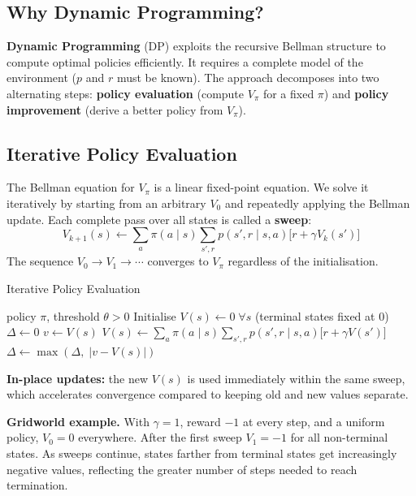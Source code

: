 \documentclass[11pt,a4paper]{article}
\newcommand{\term}[1]{\textcolor{DefGreen}{\textbf{#1}}}
\begin{document}
\subsection{Why Dynamic Programming?}

\term{Dynamic Programming} (DP) exploits the recursive Bellman structure to compute optimal policies efficiently. It requires a complete model of the environment ($p$ and $r$ must be known). The approach decomposes into two alternating steps: \textbf{policy evaluation} (compute $V_\pi$ for a fixed $\pi$) and \textbf{policy improvement} (derive a better policy from $V_\pi$).

\subsection{Iterative Policy Evaluation}

The Bellman equation for $V_\pi$ is a linear fixed-point equation. We solve it iteratively by starting from an arbitrary $V_0$ and repeatedly applying the Bellman update. Each complete pass over all states is called a \term{sweep}:
\[
V_{k+1}(s) \leftarrow \sum_a \pi(a\mid s) \sum_{s',r} p(s',r\mid s,a)\bigl[r + \gamma V_k(s')\bigr]
\]
The sequence $V_0 \to V_1 \to \cdots$ converges to $V_\pi$ regardless of the initialisation.

\begin{algobox}[breakable]{Iterative Policy Evaluation}
\begin{algorithmic}[1]
\Require policy $\pi$, threshold $\theta > 0$
\State Initialise $V(s) \leftarrow 0\;\forall s$ (terminal states fixed at $0$)
\Repeat
  \State $\Delta \leftarrow 0$
    \State $v \leftarrow V(s)$
    \State $V(s) \leftarrow \displaystyle\sum_a \pi(a\mid s)\sum_{s',r} p(s',r\mid s,a)\bigl[r+\gamma V(s')\bigr]$
    \State $\Delta \leftarrow \max(\Delta,\;|v - V(s)|)$
  \EndFor
\Until{$\Delta < \theta$}
\end{algorithmic}
\textbf{In-place updates:} the new $V(s)$ is used immediately within the same sweep, which accelerates convergence compared to keeping old and new values separate.
\end{algobox}

\textbf{Gridworld example.} With $\gamma=1$, reward $-1$ at every step, and a uniform policy, $V_0 = 0$ everywhere. After the first sweep $V_1 = -1$ for all non-terminal states. As sweeps continue, states farther from terminal states get increasingly negative values, reflecting the greater number of steps needed to reach termination.
\end{document}
